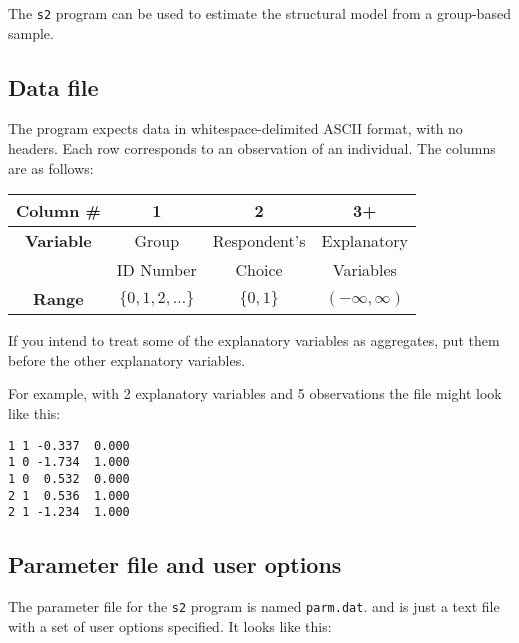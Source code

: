 \documentclass{article}
\begin{document}
The {\tt s2} program can be used to estimate the structural model from a group-based sample.

\subsection{Data file}

The program expects data in whitespace-delimited ASCII format, with
no headers.  Each row corresponds to an observation of an individual.
The columns are as follows:
\begin{center}
\begin{tabular}{|c|c|c|c|}
\hline
{\footnotesize {\bf Column \# }} & {\footnotesize \bf 1} & {\footnotesize 2} & {\footnotesize 3+} \\ 
\hline
{\footnotesize {\bf Variable }} & {\footnotesize Group } & {\footnotesize Respondent's} & {\footnotesize Explanatory} \\
                                & {\footnotesize ID Number}     & {\footnotesize Choice      } & {\footnotesize Variables} \\
\hline
{\footnotesize {\bf Range }} & {\footnotesize $\{0,1,2,\ldots\}$} & {\footnotesize $\{0,1\}$} & {\footnotesize $(-\infty,\infty)$} \\
\hline
\end{tabular}
\end{center}
If you intend to treat some of the explanatory variables as aggregates, put them 
before the other explanatory variables.

For example, with 2 explanatory variables and 5 observations the 
file might look like this:
{\scriptsize
\begin{verbatim}
1 1 -0.337  0.000
1 0 -1.734  1.000
1 0  0.532  0.000
2 1  0.536  1.000
2 1 -1.234  1.000
\end{verbatim}
}

\subsection{Parameter file and user options}

The parameter file for the {\tt s2} program is named {\tt parm.dat}.
and is just a text file with a set of user options specified.  It looks like this:
\end{document}
